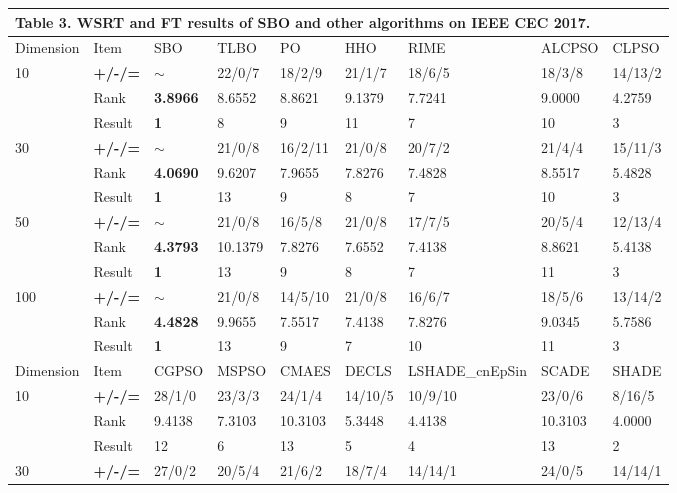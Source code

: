 \documentclass{article} %
\begin{document}
\begin{tabular}{|p{0.5in}|p{0.3in}|p{0.4in}|p{0.4in}|p{0.4in}|p{0.4in}|p{0.8in}|p{0.4in}|p{0.4in}|} \hline 
\multicolumn{9}{|p{1in}|}{\textbf{Table }3\textbf{. }WSRT and FT results of SBO and other algorithms on IEEE CEC 2017.} \\ \hline 
Dimension & Item & SBO & TLBO & PO & HHO & RIME & ALCPSO & CLPSO \\ \hline 
10 & \textbf{+/-/=} & $\mathrm{\sim}$ & 22/0/7 & 18/2/9 & 21/1/7 & 18/6/5 & 18/3/8 & 14/13/2 \\ \hline 
 & Rank\textbf{} & \textbf{3.8966} & 8.6552 & 8.8621 & 9.1379 & 7.7241 & 9.0000 & 4.2759 \\ \hline 
 & Result\textbf{} & \textbf{1} & 8 & 9 & 11 & 7 & 10 & 3 \\ \hline 
30 & \textbf{+/-/=} & $\mathrm{\sim}$\textbf{} & 21/0/8 & 16/2/11 & 21/0/8 & 20/7/2 & 21/4/4 & 15/11/3 \\ \hline 
 & Rank\textbf{} & \textbf{4.0690} & 9.6207 & 7.9655 & 7.8276 & 7.4828 & 8.5517 & 5.4828 \\ \hline 
 & Result\textbf{} & \textbf{1} & 13 & 9 & 8 & 7 & 10 & 3 \\ \hline 
50 & \textbf{+/-/=} & $\mathrm{\sim}$\textbf{} & 21/0/8 & 16/5/8 & 21/0/8 & 17/7/5 & 20/5/4 & 12/13/4 \\ \hline 
 & Rank\textbf{} & \textbf{4.3793} & 10.1379 & 7.8276 & 7.6552 & 7.4138 & 8.8621 & 5.4138 \\ \hline 
 & Result\textbf{} & \textbf{1} & 13 & 9 & 8 & 7 & 11 & 3 \\ \hline 
100 & \textbf{+/-/=} & $\mathrm{\sim}$ & 21/0/8 & 14/5/10 & 21/0/8 & 16/6/7 & 18/5/6 & 13/14/2 \\ \hline 
 & Rank\textbf{} & \textbf{4.4828} & 9.9655 & 7.5517 & 7.4138 & 7.8276 & 9.0345 & 5.7586 \\ \hline 
 & Result\textbf{} & \textbf{1} & 13 & 9 & 7 & 10 & 11 & 3 \\ \hline 
Dimension & Item & CGPSO & MSPSO & CMAES & DECLS & LSHADE\_cnEpSin & SCADE & SHADE \\ \hline 
10 & \textbf{+/-/=} & 28/1/0 & 23/3/3 & 24/1/4 & 14/10/5 & 10/9/10 & 23/0/6 & 8/16/5 \\ \hline 
 & Rank & 9.4138 & 7.3103 & 10.3103 & 5.3448 & 4.4138 & 10.3103 & 4.0000 \\ \hline 
 & Result & 12 & 6 & 13 & 5 & 4 & 13 & 2 \\ \hline 
30 & \textbf{+/-/=} & 27/0/2 & 20/5/4 & 21/6/2 & 18/7/4 & 14/14/1 & 24/0/5 & 14/14/1 \\ \hline 

\end{tabular}
\end{document}
